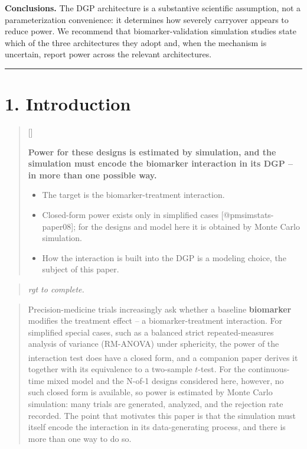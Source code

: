 \documentclass[
  11pt,
]{article}
\newcounter{pgraph}
\newenvironment{bullets}{%
  \stepcounter{pgraph}%
  \begin{quote}\small\sffamily\color[gray]{0.30}%
  {\normalfont\scriptsize\color[gray]{0.58}[\thepgraph]\enspace}}{%
  \end{quote}}
\newenvironment{rgt}{%
  \begin{quote}\small\itshape\color[RGB]{20,60,160}}{%
  \end{quote}}
\newenvironment{orig}{%
  \begin{quote}\normalsize\color[gray]{0.55}}{%
  \end{quote}}
\begin{document}
\textbf{Conclusions.} The DGP architecture is a substantive scientific
assumption, not a parameterization convenience: it determines how
severely carryover appears to reduce power. We recommend that
biomarker-validation simulation studies state which of the three
architectures they adopt and, when the mechanism is uncertain, report
power across the relevant architectures.

\bigskip\noindent

\rule{\textwidth}{0.4pt}\bigskip

\section{1. Introduction}

\begin{bullets}

\textbf{Power for these designs is estimated by simulation, and the
simulation must encode the biomarker interaction in its DGP -- in
more than one possible way.}

\begin{itemize}\setlength{\itemsep}{2pt}\setlength{\parskip}{0pt}
\item The target is the biomarker-treatment interaction.
\item Closed-form power exists only in simplified cases
[@pmsimstats-paper08]; for the designs and model here it is obtained by
Monte Carlo simulation.
\item How the interaction is built into the DGP is a modeling
choice, the subject of this paper.
\end{itemize}

\end{bullets}

\begin{rgt}
rgt to complete.

\end{rgt}

\begin{orig}
Precision-medicine trials increasingly ask whether a baseline
\textbf{biomarker} modifies the treatment effect -- a
biomarker-treatment interaction. For simplified special cases, such as a
balanced strict repeated-measures analysis of variance (RM-ANOVA) under
sphericity, the power of the interaction test does have a closed form,
and a companion
paper\textsuperscript{} derives it
together with its equivalence to a two-sample \(t\)-test. For the
continuous-time mixed model and the N-of-1 designs considered here,
however, no such closed form is available, so power is estimated by
Monte Carlo simulation: many trials are generated, analyzed, and the
rejection rate recorded. The point that motivates this paper is that the
simulation must itself encode the interaction in its data-generating
process, and there is more than one way to do so.

\end{orig}
\end{document}

